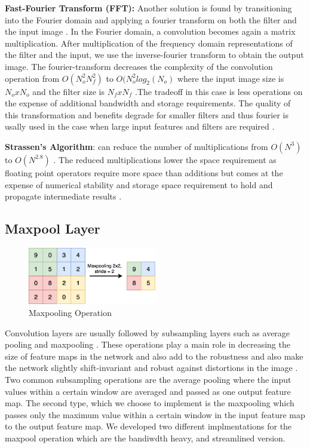 \textbf{Fast-Fourier Transform (FFT):} Another solution is found by transitioning into the Fourier domain and applying a fourier transform on both the filter and the input image \cite{vasilache2014fast}. In the Fourier domain, a convolution becomes again a matrix multiplication. After multiplication of the frequency domain representations of the filter and the input, we use the inverse-fourier transform to obtain the output image. The fourier-transform decreases the complexity of the convolution operation from $ O(N_o^2N_f^2) $ to $ O(N_o^2log_2(N_o) $ where the input image size is $ N_oxN_o$ and the filter size is $ N_fxN_f $ \cite{sze2017efficient}.The tradeoff in this case is less operations on the expense of additional bandwidth and storage requirements. The quality of this transformation and benefits degrade for smaller filters and thus fourier is usally used in the case when large input features and filters are required \cite{sze2017efficient}. 

\textbf{Strassen's Algorithm}\cite{cong2014minimizing}: can reduce the number of multiplications from $O(N^3)$ to $O(N^{2.8})$\cite{sze2017efficient} . The reduced multiplications lower the space requirement as floating point operators require more space than additions but comes at the expense of numerical stability and storage space requirement to hold and propagate intermediate results \cite{sze2017efficient}.

\subsection{Maxpool Layer}

\begin{figure}[h!]
\centering
\includegraphics[width=0.5\textwidth]{Figures/maxpool}
\decoRule
\caption[maxpool]{ Maxpooling Operation}
\label{fig:maxpool}
\end{figure}

Convolution layers are usually followed by subsampling layers such as average pooling and maxpooling \cite{lenet}. These operations play a main role in decreasing the size of feature maps in the network and also add to the robustness and also make the network slightly shift-invariant and robust against distortions in the image \cite{alexnet}. Two common subsampling operations are the average pooling where the input values within a certain window are averaged and passed as one output feature map. The second type, which we choose to implement is the maxpooling which passes only the maximum value within a certain window in the input feature map to the output feature map. We developed two different implmentations for the maxpool operation which are the bandiwdth heavy, and streamlined version. 

